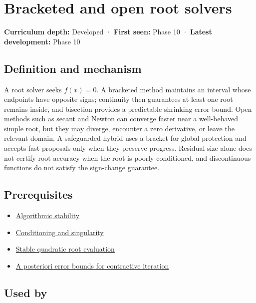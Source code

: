 \hypertarget{appendix-f63eb850796d}{}\label{referencestart:appendix-f63eb850796d}
\section{Bracketed and open root solvers}\label{appendix-f63eb850796d-bracketed-and-open-root-solvers}

\textbf{Curriculum depth:} Developed · \textbf{First seen:} Phase 10 · \textbf{Latest development:} Phase 10

\subsection{Definition and mechanism}\label{appendix-f63eb850796d-definition-and-mechanism}

A root solver seeks \(f(x)=0\). A bracketed method maintains an interval whose endpoints have opposite signs; continuity then guarantees at least one root remains inside, and bisection provides a predictable shrinking error bound. Open methods such as secant and Newton can converge faster near a well-behaved simple root, but they may diverge, encounter a zero derivative, or leave the relevant domain. A safeguarded hybrid uses a bracket for global protection and accepts fast proposals only when they preserve progress. Residual size alone does not certify root accuracy when the root is poorly conditioned, and discontinuous functions do not satisfy the sign-change guarantee.

\subsection{Prerequisites}\label{appendix-f63eb850796d-prerequisites}

\begin{itemize}
\tightlist
\item
  \hyperref[appendix-aa2bf0d79639]{Algorithmic stability}
\item
  \hyperref[appendix-8f6a01f284a7]{Conditioning and singularity}
\item
  \hyperref[appendix-b9afba7f63e5]{Stable quadratic root evaluation}
\item
  \hyperref[appendix-d83b0ad1be7f]{A posteriori error bounds for contractive iteration}
\end{itemize}

\subsection{Used by}\label{appendix-f63eb850796d-used-by}


